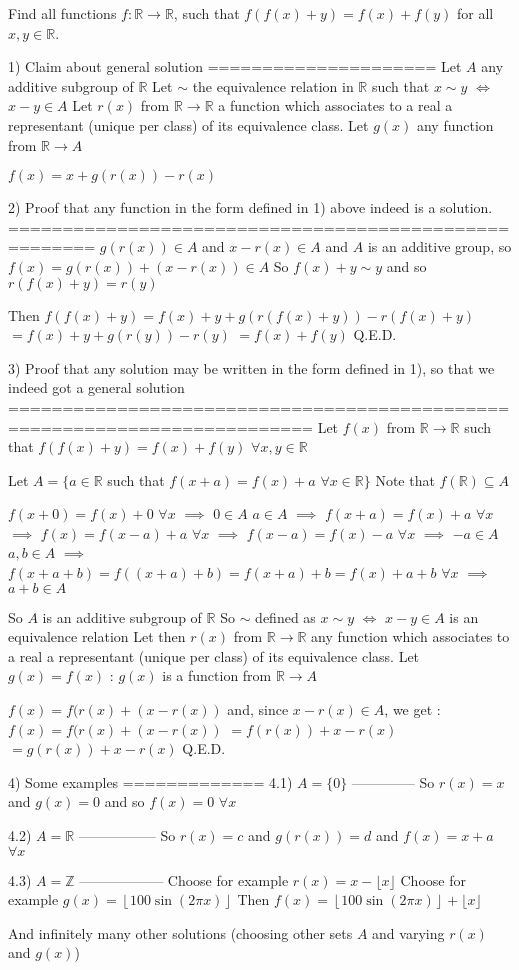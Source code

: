 \begin{solution}
	\begin{tcolorbox}Find all functions  $f: \mathbb{R}\to \mathbb{R}$, such that $f(f(x)+y) = f(x)+f(y)$ for all $x,y \in \mathbb{R}$.\end{tcolorbox}
1) Claim about general solution
=====================
Let $A$ any additive subgroup of $\mathbb R$
Let $\sim$ the equivalence relation in $\mathbb R$ such that $x\sim y$ $\iff$ $x-y\in A$
Let $r(x)$ from $\mathbb R\to\mathbb R$ a function which associates to a real a representant (unique per class) of its equivalence class.
Let $g(x)$ any function from $\mathbb R\to A$

$f(x)=x+g(r(x))-r(x)$

2) Proof that any function in the form defined in 1) above indeed is a solution.
======================================================
$g(r(x))\in A$ and $x-r(x)\in A$ and $A$ is an additive group, so $f(x)=g(r(x))+(x-r(x))\in A$
So $f(x)+y\sim y$ and so $r(f(x)+y)=r(y)$

Then $f(f(x)+y)=f(x)+y+g(r(f(x)+y))-r(f(x)+y)$ $=f(x)+y+g(r(y))-r(y)$ $=f(x)+f(y)$
Q.E.D.

3) Proof that any solution may be written in the form defined in 1), so that we indeed got a general solution
==========================================================================
Let $f(x)$ from $\mathbb R\to\mathbb R$ such that $f(f(x)+y)=f(x)+f(y)$ $\forall x,y\in\mathbb R$

Let $A=\{a\in\mathbb R$ such that $f(x+a)=f(x)+a$ $\forall x\in\mathbb R\}$
Note that $f(\mathbb R)\subseteq A$

$f(x+0)=f(x)+0$ $\forall x$ $\implies$ $0\in A$
$a\in A$ $\implies$ $f(x+a)=f(x)+a$ $\forall x$ $\implies$ $f(x)=f(x-a)+a$ $\forall x$ $\implies$ $f(x-a)=f(x)-a$ $\forall x$ $\implies$ $-a\in A$
$a,b\in A$ $\implies$ $f(x+a+b)=f((x+a)+b)=f(x+a)+b=f(x)+a+b$ $\forall x$ $\implies$ $a+b\in A$

So $A$ is an additive subgroup of $\mathbb R$
So $\sim$ defined as $x\sim y$ $\iff$ $x-y\in A$ is an equivalence relation
Let then $r(x)$ from $\mathbb R\to\mathbb R$ any function which associates to a real a representant (unique per class) of its equivalence class.
Let $g(x)=f(x)$ : $g(x)$ is a function from $\mathbb R\to A$

$f(x)=f(r(x)+(x-r(x))$ and, since $x-r(x)\in A$, we get :
$f(x)=f(r(x)+(x-r(x))$ $=f(r(x))+x-r(x)$ $=g(r(x))+x-r(x)$
Q.E.D.

4) Some examples
=============
4.1) $A=\{0\}$
--------------
So $r(x)=x$ and $g(x)=0$ and so $\boxed{f(x)=0}$ $\forall x$

4.2) $A=\mathbb R$
-----------------
So $r(x)=c$ and $g(r(x))=d$ and $\boxed{f(x)=x+a}$ $\forall x$

4.3) $A=\mathbb Z$
------------------
Choose for example $r(x)=x-\lfloor x\rfloor$
Choose for example $g(x)=\left\lfloor 100\sin(2\pi x)\right\rfloor$
Then $\boxed{f(x)=\left\lfloor 100\sin(2\pi x)\right\rfloor+\lfloor x\rfloor}$

And infinitely many other solutions (choosing other sets $A$ and varying $r(x)$ and $g(x)$)
\end{solution}
